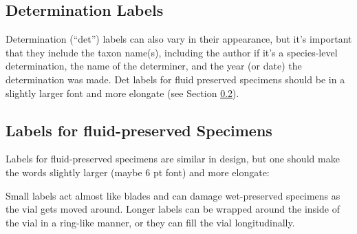 \subsection{Determination Labels}
Determination (``det'') labels can also vary in their appearance, but it's important that they include the taxon name(s), including the author if it's a species-level determination, the name of the determiner, and the year (or date) the determination was made. Det labels for fluid preserved specimens should be in a slightly larger font and more elongate (see Section \ref{fluidspecimen}).\\

\hfill\begin{minipage}{\dimexpr\textwidth-1cm}
\begin{labelfontsmall}
\tiny 
{}
\end{labelfontsmall}
\xdef\tpd{\the\prevdepth}
\end{minipage}
\normalsize\vspace{2mm}

\subsection{Labels for fluid-preserved Specimens}\label{fluidspecimen}
Labels for fluid-preserved specimens are similar in design, but one should make the words slightly larger (maybe 6 pt font) and more elongate:\\

\hfill\begin{minipage}{\dimexpr\textwidth-1cm}
\begin{labelfontsmall}
\scriptsize 
{}
\end{labelfontsmall}
\xdef\tpd{\the\prevdepth}
\end{minipage}
\normalsize\vspace{5mm}

\noindent{}Small labels act almost like blades and can damage wet-preserved specimens as the vial gets moved around. Longer labels can be wrapped around the inside of the vial in a ring-like manner, or they can fill the vial longitudinally.

